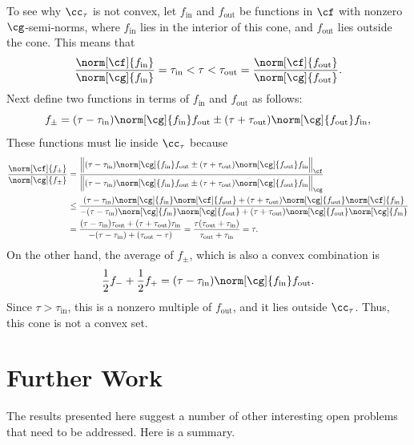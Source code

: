 \documentclass[]{elsarticle}
\theoremstyle{definition}
\theoremstyle{remark}
\begin{document}
To see why $\cc_{\tau}$ is not convex, let $f_{\text{in}}$ and $f_{\text{out}}$ be functions in $\cf$ with nonzero $\cg$-semi-norms, where $f_{\text{in}}$  lies in the interior of this cone, and $f_{\text{out}}$ lies outside the cone.  This means that 
\[
\frac{\norm[\cf]{f_{\text{in}}}} {\norm[\cg]{f_{\text{in}}}} = \tau_{\text{in}} < \tau < \tau_{\text{out}} =  \frac{\norm[\cf]{f_{\text{out}}}} {\norm[\cg]{f_{\text{out}}}}.
\]
Next define two functions in terms of $f_{\text{in}}$ and $f_{\text{out}}$ as follows:
\[
f_{\pm} = (\tau-\tau_{\text{in}}) \norm[\cg]{f_{\text{in}}} f_{\text{out}}  \pm (\tau + \tau_{\text{out}}) \norm[\cg]{f_{\text{out}}} f_{\text{in}},
\]
These functions must lie inside  $\cc_{\tau}$ because
\begin{align*}
\frac{\norm[\cf]{f_{\pm}}} {\norm[\cg]{f_{\pm}}} 
&= \frac{\Bigl \lVert (\tau-\tau_{\text{in}}) \norm[\cg]{f_{\text{in}}} f_{\text{out}}  \pm (\tau + \tau_{\text{out}}) \norm[\cg]{f_{\text{out}}} f_{\text{in}}\Bigr \rVert_{\cf}}
{\Bigl \lVert (\tau-\tau_{\text{in}}) \norm[\cg]{f_{\text{in}}} f_{\text{out}}  \pm (\tau + \tau_{\text{out}}) \norm[\cg]{f_{\text{out}}} f_{\text{in}}\Bigr \rVert_{\cg}}\\
& \le 
\frac{(\tau-\tau_{\text{in}}) \norm[\cg]{f_{\text{in}}} \norm[\cf]{f_{\text{out}}}  + (\tau + \tau_{\text{out}}) \norm[\cg]{f_{\text{out}}} \norm[\cf]{f_{\text{in}}}}
{-(\tau-\tau_{\text{in}}) \norm[\cg]{f_{\text{in}}} \norm[\cg]{f_{\text{out}}}  + (\tau + \tau_{\text{out}}) \norm[\cg]{f_{\text{out}}} \norm[\cg]{f_{\text{in}}}}\\
& =
\frac{(\tau-\tau_{\text{in}})\tau_{\text{out}}  + (\tau + \tau_{\text{out}}) \tau_{\text{in}} } {-(\tau-\tau_{\text{in}}) + (\tau_{\text{out}}-\tau)}
=
\frac{\tau (\tau_{\text{out}} +\tau_{\text{in}}) } {\tau_{\text{out}} + \tau_{\text{in}}} =  \tau.
\end{align*}
On the other hand, the average of $f_{\pm}$, which is also a convex combination is 
\[
\frac{1}{2} f_- + \frac{1}{2} f_+ = (\tau-\tau_{\text{in}}) \norm[\cg]{f_{\text{in}}} f_{\text{out}}.
\]
Since $\tau > \tau_{\text{in}}$, this is a nonzero multiple of $f_{\text{out}}$, and it lies outside $\cc_{\tau}$.  Thus, this cone is not a convex set.


\section{Further Work} \label{furthersec}

The results presented here suggest a number of other interesting open problems that need to be addressed.  Here is a summary.
\end{document}
